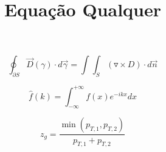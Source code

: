 \documentclass[a4paper,12pt]{article}
\title{Equação Qualquer}
\begin{document}
\maketitle

\begin{equation*}
\oint_{\partial S} \overrightarrow{D}(\gamma) \cdot d\overrightarrow{\gamma} = \int \int_{S} ( \triangledown\times D) \cdot d \overrightarrow{n}
\end{equation*}

\begin{equation*}
\widehat{f}(k) = \int_{-\infty}^{+\infty} f(x) e^{-ikx} dx
\end{equation*}

\begin{equation*}
z_g = \frac{\min (p_{T,1},p_{T,2})}{p_{T,1}+p_{T,2}}
\end{equation*}

%

%


%


%



% 
%
%
\end{document}

